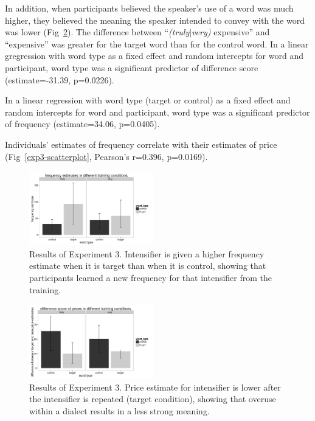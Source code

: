 \documentclass[10pt,letterpaper]{article}
\begin{document}
In addition, when participants believed the speaker's use of a word was much higher, they believed the meaning the speaker intended to convey with the word was lower (Fig~\ref{exp3-price-plot}). The difference between ``\emph{(truly$|$very)} expensive'' and ``expensive'' was greater for the target word than for the control word. In a linear gregression with word type as a fixed effect and random intercepts for word and participant, word type was a significant predictor of difference score (estimate=-31.39, p=0.0226).

In a linear regression with word type (target or control) as a fixed effect and random intercepts for word and participant, word type was a significant predictor of frequency (estimate=34.06, p=0.0405).

Individuals' estimates of frequency correlate with their estimates of price (Fig~\ref{exp3-scatterplot}, Pearson's r=0.396, p=0.0169).

\begin{figure}[ht]
\begin{center}
\includegraphics[width=0.48\textwidth]{analysis_files_for_writeup/images/exp3-freq-plot}
\end{center}
\caption{Results of Experiment 3. Intensifier is given a higher frequency estimate when it is target than when it is control, showing that participants learned a new frequency for that intensifier from the training.} 
\label{exp3-freq-plot}
\end{figure}

\begin{figure}[ht]
\begin{center}
\includegraphics[width=0.48\textwidth]{analysis_files_for_writeup/images/exp3-price-plot.png}
\end{center}
\caption{Results of Experiment 3. Price estimate for intensifier is lower after the intensifier is repeated (target condition), showing that overuse within a dialect results in a less strong meaning.} 
\label{exp3-price-plot}
\end{figure}
\end{document}
